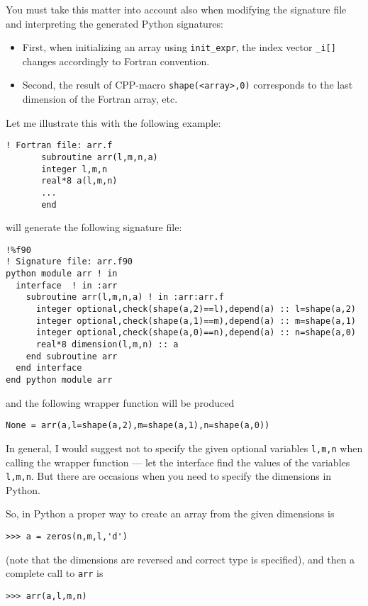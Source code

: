 You must take this matter into account also when modifying the
signature file and interpreting the generated Python signatures:

\begin{itemize}
\item First, when initializing an array using \texttt{init\_expr}, the index
vector \texttt{\_i[]} changes accordingly to Fortran convention.
\item Second, the result of CPP-macro \texttt{shape(<array>,0)}
  corresponds to the last dimension of the Fortran array, etc.
\end{itemize}
Let me illustrate this with the following example:\\
\begin{verbatim}
! Fortran file: arr.f
       subroutine arr(l,m,n,a)
       integer l,m,n
       real*8 a(l,m,n)
       ...
       end
\end{verbatim}
\fpy will generate the following signature file:\\
\begin{verbatim}
!%f90
! Signature file: arr.f90
python module arr ! in 
  interface  ! in :arr
    subroutine arr(l,m,n,a) ! in :arr:arr.f
      integer optional,check(shape(a,2)==l),depend(a) :: l=shape(a,2)
      integer optional,check(shape(a,1)==m),depend(a) :: m=shape(a,1)
      integer optional,check(shape(a,0)==n),depend(a) :: n=shape(a,0)
      real*8 dimension(l,m,n) :: a
    end subroutine arr
  end interface 
end python module arr
\end{verbatim}
and the following wrapper function will be produced
\begin{verbatim}
None = arr(a,l=shape(a,2),m=shape(a,1),n=shape(a,0))
\end{verbatim}

In general, I would suggest not to specify the given optional
variables \texttt{l,m,n} when calling the wrapper function --- let the
interface find the values of the variables \texttt{l,m,n}. But there
are occasions when you need to specify the dimensions in Python.

So, in Python a proper way to create an array from the given
dimensions is
\begin{verbatim}
>>> a = zeros(n,m,l,'d')
\end{verbatim}
(note that the dimensions are reversed and correct type is specified),
and then a complete call to \texttt{arr} is
\begin{verbatim}
>>> arr(a,l,m,n)
\end{verbatim}

